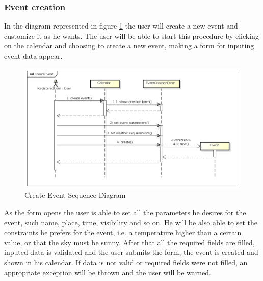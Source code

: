 \subsubsection{Event creation}
In the diagram represented in figure \ref{fig:createseqdiag} the user will create a new event and customize it as he wants. The user will be able to start this procedure by clicking on the calendar and choosing to create a new event, making a form for inputing event data appear.
\begin{center}
 \begin{figure}[H]
    \includegraphics[width=1\textwidth]{./UMLDiagram/sequence/CreateEvent/CreateEvent.png}
    \caption{Create Event Sequence Diagram}
     \label{fig:createseqdiag}
     \end{figure}
   \end{center}
As the form opens the user is able to set all the parameters he desires for the event, such name, place, time, visibility and so on. He will be also able to set the constraints he prefers for the event, i.e. a temperature higher than a certain value, or that the sky must be sunny. After that all the required fields are filled, inputed data is validated and the user submits the form, the event is created and shown in his calendar. If data is not valid or required fields were not filled, an appropriate exception will be thrown and the user will be warned.

